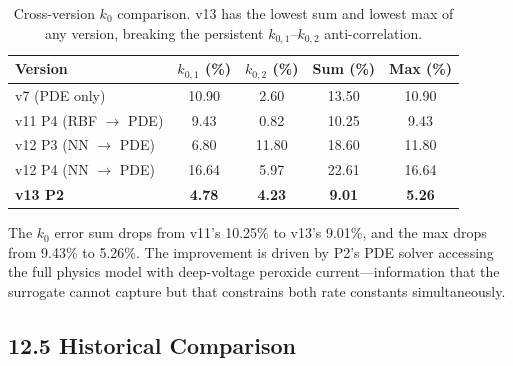 \documentclass[11pt]{article}
\begin{document}
\begin{table}[H]
  \centering
  \caption{Cross-version $k_0$ comparison.  v13 has the lowest sum and
           lowest max of any version, breaking the persistent
           $k_{0,1}$--$k_{0,2}$ anti-correlation.}
  \label{tab:v13_tradeoff}
  \begin{tabular}{l S[round-precision=2] S[round-precision=2]
                    S[round-precision=2] S[round-precision=2]}
    \toprule
    Version & {$k_{0,1}$ (\%)} & {$k_{0,2}$ (\%)}
            & {Sum (\%)} & {Max (\%)} \\
    \midrule
    v7 (PDE only)        & 10.90 &  2.60 & 13.50 & 10.90 \\
    v11 P4 (RBF $\to$ PDE) &  9.43 &  0.82 & 10.25 &  9.43 \\
    v12 P3 (NN $\to$ PDE)  &  6.80 & 11.80 & 18.60 & 11.80 \\
    v12 P4 (NN $\to$ PDE)  & 16.64 &  5.97 & 22.61 & 16.64 \\
    \textbf{v13 P2}      &\textbf{4.78} &\textbf{4.23} &\textbf{9.01} &\textbf{5.26} \\
    \bottomrule
  \end{tabular}
\end{table}

The $k_0$ error sum drops from v11's 10.25\% to v13's 9.01\%, and the max
drops from 9.43\% to 5.26\%.  The improvement is driven by P2's PDE solver
accessing the full physics model with deep-voltage peroxide current---information
that the surrogate cannot capture but that constrains both rate constants
simultaneously.

\subsection*{12.5 Historical Comparison}
\end{document}
